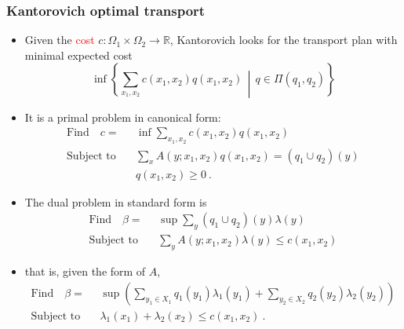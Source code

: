 \documentclass[xcolor=svgnames]{beamer}
\newcommand{\reals}{\mathbb{R}}
\newcommand{\rosso}[1]{\textcolor{red}{#1}}
\newcommand{\setof}[2]{\left\{#1 \, \middle| \, #2 \right\}}
\renewcommand{\emph}{\rosso}
\begin{document}
\begin{frame}\small\frametitle{Kantorovich optimal transport}
\begin{itemize}
    \item Given the \emph{cost} $c \colon \Omega_1 \times \Omega_2 \to \reals$, Kantorovich looks for the transport plan with minimal expected cost
    \begin{equation*}
        \inf \setof{\sum_{x_1,x_2} c(x_1,x_2) q(x_1,x_2)}{q \in \Pi(q_1,q_2)}
    \end{equation*}
    \item It is a primal problem in canonical form:
       \begin{align*}
      \text{Find} \quad c =& \inf \sum_{x_1,x_2} c(x_1,x_2) q(x_1,x_2) \\
      \text{Subject to} \quad &\sum_x A(y;x_1,x_2) q(x_1,x_2) = (q_1 \cup q_2)(y) \\
      &q(x_1,x_2) \geq 0 \ .
    \end{align*}
\end{itemize}

\begin{itemize}
    \item The dual problem in standard form is
    \begin{align*}
      \text{Find} \quad \beta =& \sup \sum_y (q_1 \cup q_2) (y) \lambda(y) \\
      \text{Subject to} \quad &\sum_y A(y;x_1,x_2) \lambda(y) \leq c(x_1,x_2) 
    \end{align*}
\item    that is, given the form of $A$,
\begin{align*}
      \text{Find} \quad \beta =& \sup \left(\sum_{y_1\in X_1}q_1(y_1) \lambda_1(y_1) + \sum_{y_2 \in X_2} q_2(y_2) \lambda_2(y_2)\right) \\
      \text{Subject to} \quad &\lambda_1(x_1) + \lambda_2(x_2) \leq c(x_1,x_2) \ .
    \end{align*}
\end{itemize}


\end{frame}
\end{document}
